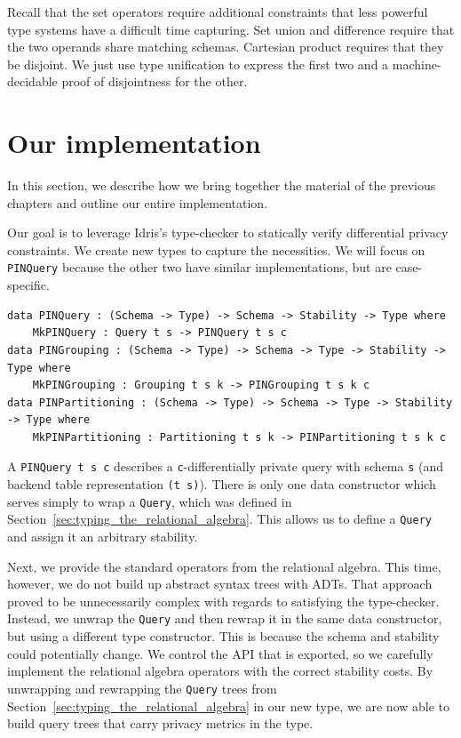 \documentclass[12pt]{article}
\begin{document}
Recall that the set operators require additional constraints that less powerful type systems have a difficult time capturing.
Set union and difference require that the two operands share matching schemas.
Cartesian product requires that they be disjoint.
We just use type unification to express the first two and a machine-decidable proof of disjointness for the other.


\section{Our implementation}\label{sec:our_implementation}

In this section, we describe how we bring together the material of the previous chapters and outline our entire implementation.

Our goal is to leverage Idris's type-checker to statically verify differential privacy constraints.
We create new types to capture the necessities.
We will focus on \texttt{PINQuery} because the other two have similar implementations, but are case-specific.

\begin{lstlisting}
data PINQuery : (Schema -> Type) -> Schema -> Stability -> Type where
    MkPINQuery : Query t s -> PINQuery t s c
data PINGrouping : (Schema -> Type) -> Schema -> Type -> Stability -> Type where
    MkPINGrouping : Grouping t s k -> PINGrouping t s k c
data PINPartitioning : (Schema -> Type) -> Schema -> Type -> Stability -> Type where
    MkPINPartitioning : Partitioning t s k -> PINPartitioning t s k c
\end{lstlisting}


A \texttt{PINQuery t s c} describes a \texttt{c}-differentially private query with schema \texttt{s} (and backend table representation \texttt{(t s)}).
There is only one data constructor which serves simply to wrap a \texttt{Query}, which was defined in Section~\ref{sec:typing_the_relational_algebra}.
This allows us to define a \texttt{Query} and assign it an arbitrary stability.

Next, we provide the standard operators from the relational algebra.
This time, however, we do not build up abstract syntax trees with ADTs.
That approach proved to be unnecessarily complex with regards to satisfying the type-checker.
Instead, we unwrap the \texttt{Query} and then rewrap it in the same data constructor, but using a different type constructor.
This is because the schema and stability could potentially change.
We control the API that is exported, so we carefully implement the relational algebra operators with the correct stability costs.
By unwrapping and rewrapping the \texttt{Query} trees from Section~\ref{sec:typing_the_relational_algebra} in our new type, we are now able to build query trees that carry privacy metrics in the type.
\end{document}
